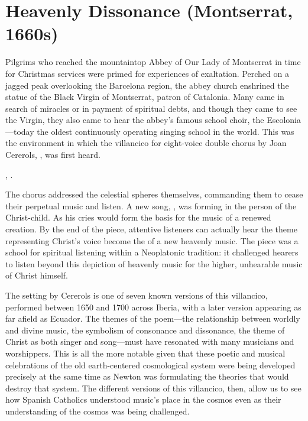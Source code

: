 
% 
% 
%

\chapter{Heavenly Dissonance (Montserrat, 1660s)}
\label{ch:cererols-suspended}

Pilgrims who reached the mountaintop Abbey of Our Lady of Montserrat in time for
Christmas services were primed for experiences of exaltation.
Perched on a jagged peak overlooking the Barcelona region, the abbey church
enshrined the statue of the Black Virgin of Montserrat, patron of Catalonia.
Many came in search of miracles or in payment of spiritual debts, and though
they came to see the Virgin, they also came to hear the abbey's famous school
choir, the Escolonia---today the oldest continuously operating singing school in
the world.
This was the environment in which the villancico for eight-voice double chorus
by Joan Cererols, , was first
heard.%
\begin{Footnote}
    , \autocites{Cashner:WLSCM32}{Cererols:MEM-VC}.
\end{Footnote}
The chorus addressed the celestial spheres themselves, commanding them to cease
their perpetual music and listen.
A new song, , was forming in the person of the
Christ-child. 
As  his cries would form the basis for the music of a
renewed creation.
By the end of the piece, attentive listeners can actually hear the theme
representing Christ's voice become the  of a new heavenly
music. 
The piece was a school for spiritual listening within a Neoplatonic tradition:
it challenged hearers to listen beyond this depiction of heavenly music for the
higher, unhearable music of Christ himself.

The setting by Cererols is one of seven known versions of this villancico,
performed between 1650 and 1700 across Iberia, with a later version appearing as
far afield as Ecuador.
The themes of the poem---the relationship between worldly and divine music, the
symbolism of consonance and dissonance, the theme of Christ as both singer and
song---must have resonated with many musicians and worshippers.
This is all the more notable given that these poetic and musical celebrations of
the old earth-centered cosmological system were being developed precisely at the
same time as Newton was formulating the theories that would destroy that system.
The different versions of this villancico, then, allow us to see how Spanish
Catholics understood music's place in the cosmos even as their understanding of
the cosmos was being challenged.

